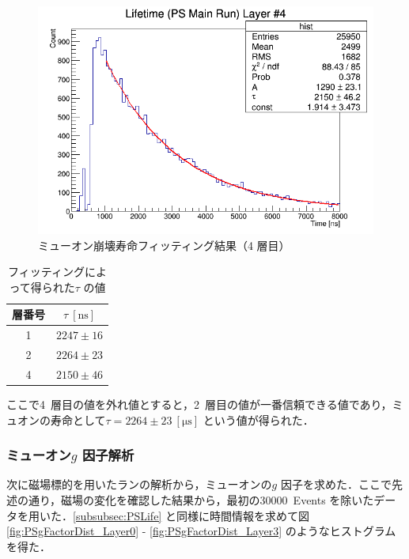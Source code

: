 \begin{figure}[h]
\begin{minipage}{0.45\textwidth}
	\includegraphics[width = \textwidth]{figure/odagawa/PSLifetimeFit_Layer3.png}
	\caption{ミューオン崩壊寿命フィッティング結果（4 層目）}
	\label{fig:PSLifeFit_Layer3}
	\end{minipage}
\end{figure}%

\begin{table}[h]
	\centering
	\caption{フィッティングによって得られた$\tau$ の値}
	\begin{tabular}{cc}\toprule
	層番号 & $\tau~[\mathrm{ns}]$ \\ \midrule
	1 & $2247 \pm 16$ \\
	2 & $2264 \pm 23$ \\
	4 & $2150 \pm 46$ \\ \bottomrule
	\end{tabular}\label{tab:PSLifetime}
\end{table}%

ここで4~層目の値を外れ値とすると，2~層目の値が一番信頼できる値であり，ミュオンの寿命として$\tau = 2264 \pm 23~[\mathrm{\mu s}]$ という値が得られた．

\newpage

\subsubsection{ミューオン$g$ 因子解析}
\label{subsubsec:PSgFactor}
次に磁場標的を用いたランの解析から，ミューオンの$g$ 因子を求めた．ここで先述の通り，磁場の変化を確認した結果から，最初の30000~Events を除いたデータを用いた．\ref{subsubsec:PSLife} と同様に時間情報を求めて図\ref{fig:PSgFactorDist_Layer0} - \ref{fig:PSgFactorDist_Layer3} のようなヒストグラムを得た．

